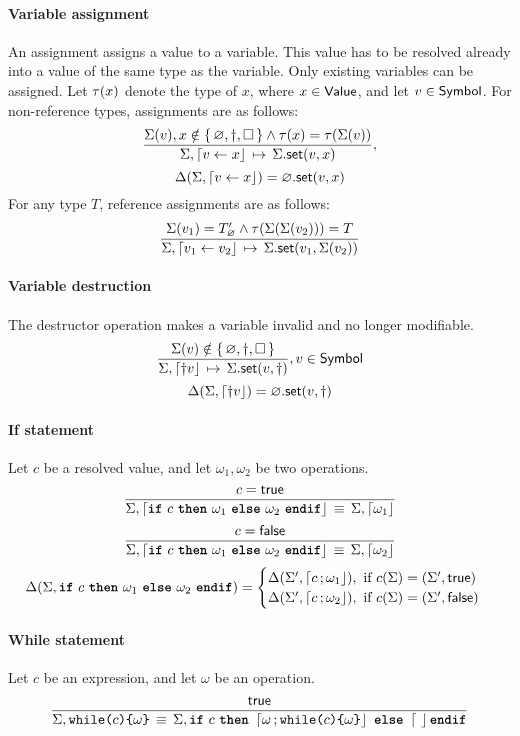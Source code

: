 \paragraph{Variable assignment}
An assignment assigns a value to a variable.
This value has to be resolved already into a value of the same type as the variable.
Only existing variables can be assigned.
Let $\tau(x)$ denote the type of $x$, where $x \in \mathsf{Value}$, and let $v \in \mathsf{Symbol}$.
For non-reference types, assignments are as follows:
$$
\semrule
	{\Sigma(v), x \notin \set{\varnothing, \dagger, \Box} \land
		\typeof{x} = \typeof{\Sigma(v)}}
	{\Sigma, \stmt{v \gets x}}
	{\StSet{\Sigma}{v}{x}},
$$
$$
\Delta(\Sigma, \stmt{v \gets x}) = \StSet{\varnothing}{v}{x}
$$
For any type $T$, reference assignments are as follows:
$$
\semrule
	{\Sigma(v_1) = \reft{T}_\varnothing \land
		\typeof{\Sigma(\Sigma(v_2))} = T}
	{\Sigma, \stmt{v_1 \gets v_2}}
	{\StSet{\Sigma}{v_1}{\Sigma(v_2)}}
$$

\paragraph{Variable destruction}
The destructor operation makes a variable invalid and no longer modifiable.
$$
\semrule
	{\Sigma(v) \notin \set{\varnothing, \dagger, \Box}}
	{\Sigma, \stmt{\dagger v}}
	{\StSet{\Sigma}{v}{\dagger}},
		v \in \Symbol
$$
$$
\Delta(\Sigma, \stmt{\dagger v}) = \StSet{\varnothing}{v}{\dagger}
$$


\paragraph{If statement}
Let $c$ be a resolved value, and let $\omega_1, \omega_2$ be two operations.
$$
\semruleeq
	{c = \true}
	{\Sigma, \stmt{\ifstmt{c}{\omega_1}{\omega_2}}}
	{\Sigma, \stmt{\omega_1}}
$$
$$
\semruleeq
	{c = \false}
	{\Sigma, \stmt{\ifstmt{c}{\omega_1}{\omega_2}}}
	{\Sigma, \stmt{\omega_2}}
$$
$$
\Delta(\Sigma, \ifstmt{c}{\omega_1}{\omega_2}) =
\begin{cases}
  \Delta(\Sigma', \stmt{c}{\omega_1}), ~ \text{if } c(\Sigma) = (\Sigma', \true)\\
  \Delta(\Sigma', \stmt{c}{\omega_2}), ~ \text{if } c(\Sigma) = (\Sigma', \false)
\end{cases}
$$

\paragraph{While statement}
Let $c$ be an expression, and let $\omega$ be an operation.
$$
\semruleeq
       {\true}
       {\Sigma, \whilestmt{c}{\omega}}
       {\Sigma, \ifstmt{c}{\stmt{\omega}{\whilestmt{c}{\omega}}}{\stmt}}
$$

